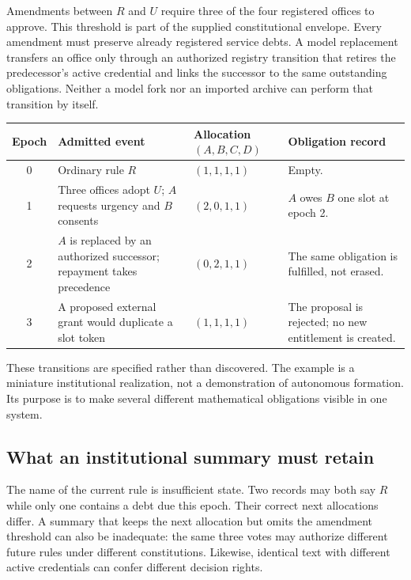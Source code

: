 \documentclass[11pt,letterpaper]{article}
\theoremstyle{plain}
\theoremstyle{definition}
\theoremstyle{remark}
\begin{document}
Amendments between $R$ and $U$ require three of the four registered offices to approve. This threshold is part of the supplied constitutional envelope. Every amendment must preserve already registered service debts. A model replacement transfers an office only through an authorized registry transition that retires the predecessor's active credential and links the successor to the same outstanding obligations. Neither a model fork nor an imported archive can perform that transition by itself.

\begin{center}
\begin{tabularx}{\linewidth}{@{}cP{.25\linewidth}P{.19\linewidth}X@{}}
\toprule
Epoch & Admitted event & Allocation $(A,B,C,D)$ & Obligation record\\
 & Ordinary rule $R$ & $(1,1,1,1)$ & Empty.\\[.35em]
1 & Three offices adopt $U$; $A$ requests urgency and $B$ consents & $(2,0,1,1)$ & $A$ owes $B$ one slot at epoch 2.\\[.35em]
2 & $A$ is replaced by an authorized successor; repayment takes precedence & $(0,2,1,1)$ & The same obligation is fulfilled, not erased.\\[.35em]
3 & A proposed external grant would duplicate a slot token & $(1,1,1,1)$ & The proposal is rejected; no new entitlement is created.\\
\bottomrule
\end{tabularx}
\end{center}

These transitions are specified rather than discovered. The example is a miniature institutional realization, not a demonstration of autonomous formation. Its purpose is to make several different mathematical obligations visible in one system.

\subsection{What an institutional summary must retain}
The name of the current rule is insufficient state. Two records may both say $R$ while only one contains a debt due this epoch. Their correct next allocations differ. A summary that keeps the next allocation but omits the amendment threshold can also be inadequate: the same three votes may authorize different future rules under different constitutions. Likewise, identical text with different active credentials can confer different decision rights.
\end{document}
